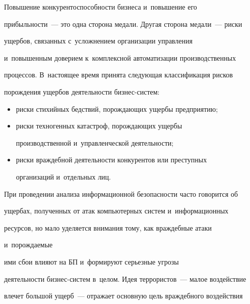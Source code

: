   


  Повышение конкурентоспособности бизнеса и~повышение его 


 при\-быль\-ности~--- это одна сторона медали. Другая сторона медали~--- рис\-ки 


ущербов, связанных с~услож\-не\-ни\-ем организации управ\-ле\-ния 


и~повышенным доверием к~комплексной автоматизации производственных 


процессов. В~на\-сто\-ящее время принята сле\-ду\-ющая классификация рис\-ков  


по\-рож\-де\-ния ущербов де\-я\-тель\-ности биз\-нес-сис\-тем:


  \begin{itemize}


\item риски стихийных бедствий, порождающих ущер\-бы предприятию; %


\item риски техногенных катастроф, порож\-да\-ющих ущер\-бы 


производственной и~управ\-лен\-че\-ской де\-я\-тель\-ности; %





\pagebreak





\item риски враждебной деятельности конкурентов или пре\-ступ\-ных 


организаций и~отдельных лиц. 


\end{itemize}


  


  При проведении анализа информационной безопас\-ности час\-то говорится об 


ущер\-бах, полученных от атак компьютерных сис\-тем и~информационных 


ресурсов, но мало уделяется внимания тому, как враж\-деб\-ные атаки 


и~по\-рож\-да\-емые


 ими сбои влияют на БП и~формируют серьезные угрозы 


деятельности биз\-нес-сис\-тем в~целом. Идея террористов~--- малое воздействие 


влечет большой ущерб~--- отражает основную цель враж\-деб\-но\-го воздействия 


